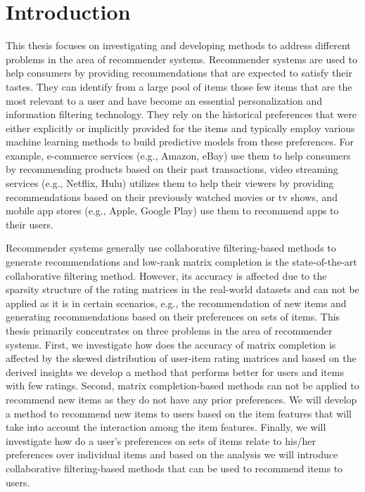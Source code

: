 \chapter{Introduction}
\label{ch:intro}

This thesis focuses on investigating and developing methods to address
different problems in the area of recommender systems. 
Recommender systems are used to help consumers by providing recommendations
that are expected to satisfy their tastes. 
They can identify from a large pool of items those few
items that are the most relevant to a user and have become an essential
personalization and information filtering technology. They rely on the historical
preferences that were either explicitly or implicitly provided for the items and
typically employ various machine learning methods to build predictive models from
these preferences. 
For example, e-commerce services (e.g., Amazon, eBay) use them to help consumers by
recommending products based on their past transactions, video streaming services
(e.g., Netflix, Hulu) utilizes them to help their viewers by providing
recommendations based on their
previously watched movies or tv shows, and mobile app stores (e.g., Apple, Google Play)
use them to recommend apps to their users.


Recommender systems generally use collaborative filtering-based methods to generate
recommendations and low-rank matrix completion is the state-of-the-art collaborative
filtering method. However, its accuracy is affected due to the sparsity structure of
the rating matrices in the real-world datasets and can not be applied as it is in
certain scenarios, e.g., the recommendation of new items and generating recommendations
based on their preferences on sets of items. This thesis primarily concentrates on
three problems in the area of recommender systems. First, we investigate how does
the accuracy of matrix completion is affected by the skewed distribution of user-item rating
matrices and based on the derived insights we develop a method that performs better for
users and items with few ratings. Second, matrix completion-based methods can not be
applied to recommend new items as they do not have any prior preferences. We will
develop a method to recommend new items to users based on the item features that will take
into account the interaction among the item features. Finally, we will investigate how do
a user's preferences on sets of items relate to his/her preferences over individual items
and based on the analysis we will introduce collaborative filtering-based methods that can
be used to recommend items to users.

